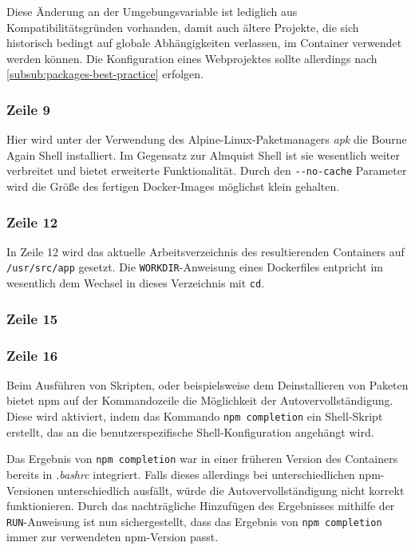 Diese Änderung an der Umgebungsvariable ist lediglich aus Kompatibilitätsgründen vorhanden, damit auch ältere Projekte, die sich historisch bedingt auf globale Abhängigkeiten verlassen, im Container verwendet werden können.
Die Konfiguration eines Webprojektes sollte allerdings nach \cref{subsub:packages-best-practice} erfolgen.

\subsubsection{Zeile 9}
Hier wird unter der Verwendung des Alpine-Linux-Paketmanagers \emph{apk} die Bourne Again Shell installiert.
Im Gegensatz zur Almquist Shell ist sie wesentlich weiter verbreitet und bietet erweiterte Funktionalität.
Durch den \verb|--no-cache| Parameter wird die Größe des fertigen Docker-Images möglichst klein gehalten.

\subsubsection{Zeile 12}
In Zeile 12 wird das aktuelle Arbeitsverzeichnis des resultierenden Containers auf \verb|/usr/src/app| gesetzt.
Die \verb|WORKDIR|-Anweisung eines Dockerfiles entpricht im wesentlich dem Wechsel in dieses Verzeichnis mit \verb|cd|.

\subsubsection {Zeile 15}


\subsubsection {Zeile 16}
Beim Ausführen von Skripten, oder beispielsweise dem Deinstallieren von Paketen bietet npm auf der Kommandozeile die Möglichkeit der Autovervollständigung.
Diese wird aktiviert, indem das Kommando \verb|npm completion| ein Shell-Skript erstellt, das an die benutzerspezifische Shell-Konfiguration angehängt wird.

Das Ergebnis von \verb|npm completion| war in einer früheren Version des Containers bereits in \emph{.bashrc} integriert.
Falls dieses allerdings bei unterschiedlichen npm-Versionen unterschiedlich ausfällt, würde die Autovervollständigung nicht korrekt funktionieren.
Durch das nachträgliche Hinzufügen des Ergebnisses mithilfe der \verb|RUN|-Anweisung ist nun sichergestellt, dass das Ergebnis von \verb|npm completion| immer zur verwendeten npm-Version passt.

